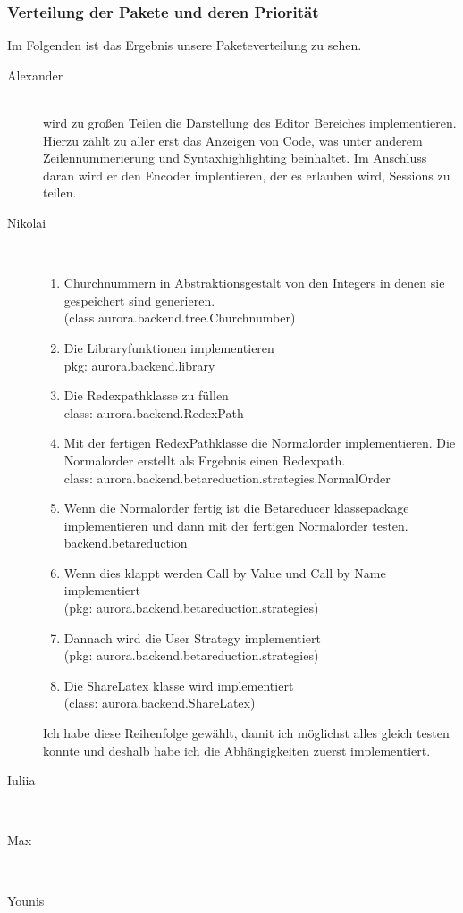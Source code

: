 \documentclass[parskip=full,11pt,twoside]{scrartcl}
\begin{document}
\subsubsection{Verteilung der Pakete und deren Priorität}
Im Folgenden ist das Ergebnis unsere Paketeverteilung zu sehen.
\begin{description}


    \item [Alexander]\hfill \\
      wird zu großen Teilen die Darstellung des Editor Bereiches implementieren.
        Hierzu zählt zu aller erst das Anzeigen von Code, was unter anderem Zeilennummerierung und Syntaxhighlighting beinhaltet.
        Im Anschluss daran wird er den Encoder implentieren, der es erlauben wird, Sessions zu teilen.
    \item [Nikolai]\hfill \\
    \begin{enumerate}
    \item Churchnummern in Abstraktionsgestalt von den Integers in denen sie gespeichert sind generieren. \\(class aurora.backend.tree.Churchnumber)
    \item  Die Libraryfunktionen implementieren \\pkg: aurora.backend.library
    \item Die Redexpathklasse zu füllen \\class: aurora.backend.RedexPath
    \item Mit der fertigen RedexPathklasse die Normalorder implementieren. Die Normalorder erstellt als Ergebnis einen Redexpath. \\class: aurora.backend.betareduction.strategies.NormalOrder
    \item Wenn die Normalorder fertig ist die Betareducer klassepackage implementieren und dann mit der fertigen Normalorder testen. backend.betareduction
    \item Wenn dies klappt werden Call by Value und Call by Name implementiert  \\(pkg: aurora.backend.betareduction.strategies)
\item Dannach wird die User Strategy implementiert \\(pkg: aurora.backend.betareduction.strategies)

\item Die ShareLatex klasse wird implementiert \\(class: aurora.backend.ShareLatex)
    \end{enumerate}
Ich habe diese Reihenfolge gewählt, damit ich möglichst alles gleich testen konnte und deshalb habe ich die Abhängigkeiten zuerst implementiert.
    \item [Iuliia]\hfill \\
    \item [Max]\hfill \\
    \item [Younis]\hfill \\


\end{description}
\end{document}
